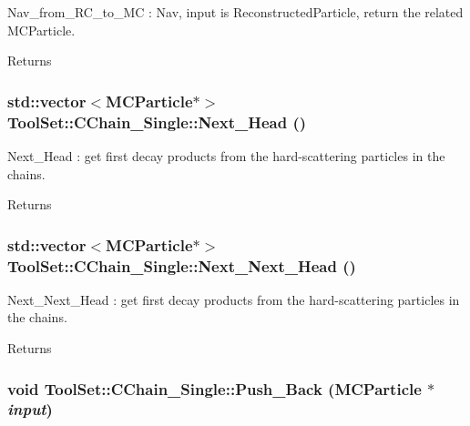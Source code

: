 Nav\_\-from\_\-RC\_\-to\_\-MC : Nav, input is ReconstructedParticle, return the related MCParticle. \begin{DoxyReturn}{Returns}

\end{DoxyReturn}
\hypertarget{classToolSet_1_1CChain__Single_af29a34bb8e658fd38590b7914ad4929f}{
\subsubsection[{Next\_\-Head}]{\setlength{\rightskip}{0pt plus 5cm}std::vector$<$MCParticle$\ast$$>$ ToolSet::CChain\_\-Single::Next\_\-Head ()}}
\label{classToolSet_1_1CChain__Single_af29a34bb8e658fd38590b7914ad4929f}


Next\_\-Head : get first decay products from the hard-\/scattering particles in the chains. \begin{DoxyReturn}{Returns}

\end{DoxyReturn}
\hypertarget{classToolSet_1_1CChain__Single_a1a7ec13ce17b0ae4ec7562f4c32578d5}{
\subsubsection[{Next\_\-Next\_\-Head}]{\setlength{\rightskip}{0pt plus 5cm}std::vector$<$MCParticle$\ast$$>$ ToolSet::CChain\_\-Single::Next\_\-Next\_\-Head ()}}
\label{classToolSet_1_1CChain__Single_a1a7ec13ce17b0ae4ec7562f4c32578d5}


Next\_\-Next\_\-Head : get first decay products from the hard-\/scattering particles in the chains. \begin{DoxyReturn}{Returns}

\end{DoxyReturn}
\hypertarget{classToolSet_1_1CChain__Single_a5aa8017f2147e06c959f3a296bc3af3b}{
\subsubsection[{Push\_\-Back}]{\setlength{\rightskip}{0pt plus 5cm}void ToolSet::CChain\_\-Single::Push\_\-Back (MCParticle $\ast$ {\em input})}}
\label{classToolSet_1_1CChain__Single_a5aa8017f2147e06c959f3a296bc3af3b}


